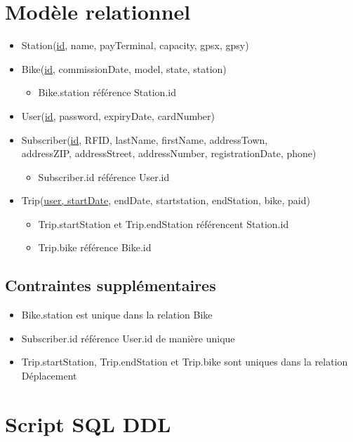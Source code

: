 \documentclass[a4paper]{article}
\begin{document}
\section{Modèle relationnel}
\begin{itemize}
\item Station(\underline{id}, name, payTerminal, capacity, gpsx, gpsy)
\item Bike(\underline{id}, commissionDate, model, state, station)
	\begin{itemize}
	\item Bike.station référence Station.id
	\end{itemize}
\item User(\underline{id}, password, expiryDate, cardNumber)
\item Subscriber(\underline{id}, RFID, lastName, firstName, addressTown,\\ addressZIP, addressStreet, addressNumber, registrationDate, phone)
	\begin{itemize}
	\item Subscriber.id référence User.id
	\end{itemize}
\item Trip(\underline{user, startDate}, endDate, startstation, endStation, bike, paid) 
	\begin{itemize}
	\item Trip.startStation et Trip.endStation référencent Station.id
    \item Trip.bike référence Bike.id
	\end{itemize}
\end{itemize}

\subsection{Contraintes supplémentaires}
\begin{itemize}
\item Bike.station est unique dans la relation Bike
\item Subscriber.id référence User.id de manière unique
\item Trip.startStation, Trip.endStation et Trip.bike sont uniques dans la relation Déplacement
\end{itemize}


\section{Script SQL DDL}
\end{document}
